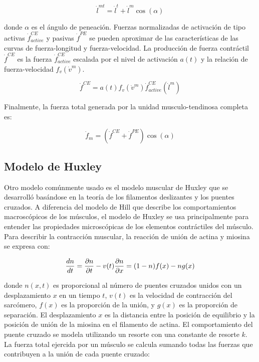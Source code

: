 \begin{equation}
	\dot{l}^{mt} = \dot{l}^t + \dot{l}^m \cos( \alpha )
\end{equation}

donde $\alpha$ es el ángulo de peneación. Fuerzas normalizadas de activación de tipo activas $\dot{f}_{active}^{CE}$ y pasivas $\dot{f}^{PE}$ se pueden aproximar de las características de las curvas de fuerza-longitud y fuerza-velocidad. La producción de fuerza contráctil $\dot{f}^{CE}$ es la fuerza $\dot{f}_{active}^{CE}$ escalada por el nivel de activación $a(t)$ y la relación de fuerza-velocidad $f_v(\dot{v}^m)$.

\begin{equation}
	\dot{f}^{CE} = a(t) f_v(\dot{v}^m)\dot{f}_{active}^{CE}(\dot{l}^m)
\end{equation}

Finalmente, la fuerza total generada por la unidad musculo-tendinosa completa es:

\begin{equation}
	\dot{f}_m = (\dot{f}^{CE} + \dot{f}^{PE})\cos(\alpha)
\end{equation}

\subsection{Modelo de Huxley}

Otro modelo comúnmente usado es el modelo muscular de Huxley \citep{huxley1957muscleContraction, huxley1974muscular} que se desarrolló basándose en la teoría de los filamentos deslizantes y los puentes cruzados. A diferencia del modelo de Hill que describe los comportamientos macroscópicos de los músculos, el modelo de Huxley se usa principalmente para entender las propiedades microscópicas de los elementos contráctiles del músculo. Para describir la contracción muscular, la reacción de unión de actina y miosina se expresa con:

\begin{equation}
	\frac{\mathnormal{dn}}{\mathnormal{dt}} = \frac{\partial n}{\partial t} - v(t) \frac{\partial n}{\partial x} =  (1-n)f(x)-ng(x)
\end{equation}

donde $n(x,t)$ es proporcional al número de puentes cruzados unidos con un desplazamiento $x$ en un tiempo $t$, $v(t)$ es la velocidad de contracción del sarcómero, $f(x)$ es la proporción de la unión, y $g(x)$ es la proporción de separación. El desplazamiento $x$ es la distancia entre la posición de equilibrio y la posición de unión de la miosina en el filamento de actina. El comportamiento del puente cruzado se modela utilizando un resorte con una constante de resorte $k$. La fuerza total ejercida por un músculo se calcula sumando todas las fuerzas que contribuyen a la unión de cada puente cruzado:

